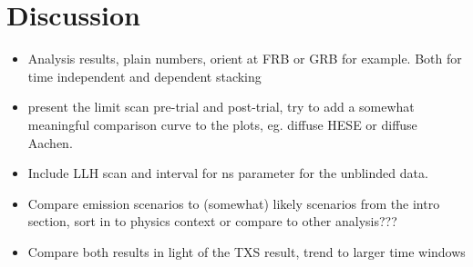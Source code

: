 \chapter{Discussion}

\begin{itemize}
  \item Analysis results, plain numbers, orient at FRB or GRB for example.
  Both for time independent and dependent stacking
  \item present the limit scan pre-trial and post-trial, try to add a somewhat meaningful comparison curve to the plots, eg. diffuse HESE or diffuse Aachen.
  \item Include LLH scan and interval for ns parameter for the unblinded data.
  \item Compare emission scenarios to (somewhat) likely scenarios from the intro section, sort in to physics context or compare to other analysis???
  \item Compare both results in light of the TXS result, trend to larger time windows
\end{itemize}